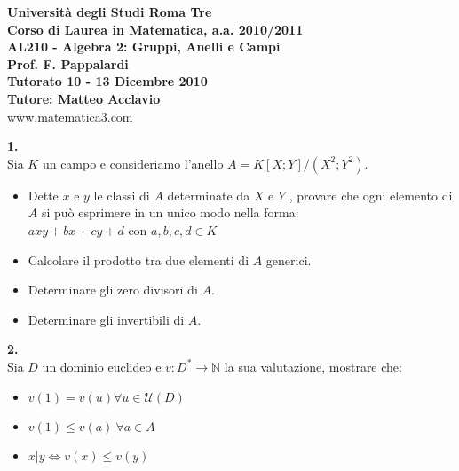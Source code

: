 \documentclass[italian,a4paper,11pt]
{article}
\newcommand{\N}{\mathbb{N}}
\newcommand{\U}{\mathcal{U}}
\newcommand{\acc}{\`}
\begin{document}
\begin{center}

\textbf{Universit\`a degli Studi Roma Tre}\\

\textbf{Corso di Laurea in Matematica, a.a. 2010/2011}\\

\textbf{AL210 - Algebra 2: Gruppi, Anelli e Campi}\\

\textbf{Prof. F. Pappalardi}\\

\textbf{Tutorato 10 - 13 Dicembre 2010}\\

\textbf{Tutore: Matteo Acclavio}\\

www.matematica3.com\\
\end{center}

\vspace{0.4 cm}
\noindent
\begin{Ex}\textbf{ 1.}\\
Sia $K$ un campo e consideriamo l'anello $A = K[X;Y]/(X^2;Y^2)$.
\begin{itemize}
\item Dette $x$ e $y$ le classi di $A$ determinate da $X$ e $Y$ , provare che ogni
elemento di $A$ si pu\acc o esprimere in un unico modo nella forma:\\ $axy + bx + cy + d$ con $a, b, c, d \in K$
\item Calcolare il prodotto tra due elementi di $A$ generici.
\item Determinare gli zero divisori di $A$.
\item Determinare gli invertibili di $A$.
\end{itemize}
\end{Ex}

\vspace{0.4 cm}
\noindent
\begin{Ex}\textbf{ 2.}\\
Sia $D$ un dominio euclideo e $v: D^* \rightarrow \N $ la sua valutazione, mostrare che:
\begin{itemize}
\item $v(1)=v(u) \forall u \in \U(D)$
\item $v(1)\leq v(a) \  \forall a\in A $
\item $x|y \Leftrightarrow v(x)\leq v(y)$
\end{itemize}
\end{Ex}
\end{document}
